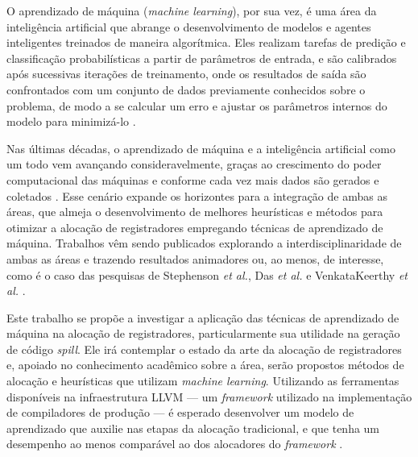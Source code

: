 \documentclass[
	12pt,				%
	openright,			%
	twoside,			%
	a4paper,			%
	tcc,			%
	]{ABNT-DC-UEL}
\begin{document}
O aprendizado de máquina (\textit{machine learning}), por sua vez, é uma área da inteligência artificial que abrange o desenvolvimento de modelos e agentes inteligentes treinados de maneira algorítmica. Eles realizam tarefas de predição e classificação probabilísticas a partir de parâmetros de entrada, e são calibrados após sucessivas iterações de treinamento, onde os resultados de saída são confrontados com um conjunto de dados previamente conhecidos sobre o problema, de modo a se calcular um erro e ajustar os parâmetros internos do modelo para minimizá-lo \cite{sharma:21}.

Nas últimas décadas, o aprendizado de máquina e a inteligência artificial como um todo vem avançando consideravelmente, graças ao crescimento do poder computacional das máquinas e conforme cada vez mais dados são gerados e coletados \cite{alpaydin:20}. Esse cenário expande os horizontes para a integração de ambas as áreas, que almeja o desenvolvimento de melhores heurísticas e métodos para otimizar a alocação de registradores empregando técnicas de aprendizado de máquina. Trabalhos vêm sendo publicados explorando a interdisciplinaridade de ambas as áreas e trazendo resultados animadores ou, ao menos, de interesse, como é o caso das pesquisas de Stephenson \textit{et al.}, Das \textit{et al.} e VenkataKeerthy \textit{et al.} \cite{amarasinghe:03, das:20, venkatakeerthy:23}.

Este trabalho se propõe a investigar a aplicação das técnicas de aprendizado de máquina na alocação de registradores, particularmente sua utilidade na geração de código \textit{spill}. Ele irá contemplar o estado da arte da alocação de registradores e, apoiado no conhecimento acadêmico sobre a área, serão propostos métodos de alocação e heurísticas que utilizam \textit{machine learning}. Utilizando as ferramentas disponíveis na infraestrutura LLVM --- um \textit{framework} utilizado na implementação de compiladores de produção --- é esperado desenvolver um modelo de aprendizado que auxilie nas etapas da alocação tradicional, e que tenha um desempenho ao menos comparável ao dos alocadores do \textit{framework} \cite{llvm:01}.


\end{document}
